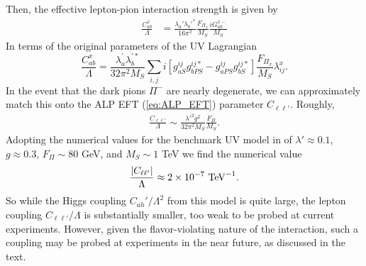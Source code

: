 Then, the effective lepton-pion interaction strength is given by
\begin{align}
    \frac{C_{ab}^x}{\Lambda} &= \frac{\lambda_a'\lambda_b'^*}{16\pi^2}\frac{F_{\Pi_x}}{M_S}\frac{iG_{ab}^{x-}}{M_S}
\end{align}
In terms of the original parameters of the UV Lagrangian
\begin{equation}
\frac{C_{ab}^x}{\Lambda} = \frac{\lambda_a^\prime\lambda_b^{\prime*}}{32\pi^2M_S}\sum_{i,j}i\left[g_{aS}^{ij}g_{bPS}^{ij*} - g_{aPS}^{ij}g_{bS}^{ij*}\right]\frac{F_{\Pi_x}}{M_S}\lambda_{ij}^x.
\end{equation}
In the event that the dark pions $\Pi^-$ are nearly degenerate, we can approximately match this onto the ALP EFT (\ref{eq:ALP_EFT}) parameter $C_{\ell\ell'}$. Roughly,
\begin{align}
    \frac{C_{\ell\ell'}}{\Lambda} \sim \frac{\lambda'^2 g^2}{32\pi^2 M_S}\frac{F_\Pi}{M_S}.
\end{align}
Adopting the numerical values for the benchmark UV model in \cite{Davoudiasl:2017zws} of $\lambda' \approx 0.1$,  $g \approx 0.3$, $F_\Pi \sim 80$ GeV, and $M_S \sim 1$ TeV we find the numerical value
%
\begin{equation}
\frac{|C_{\ell \ell'}|}{\Lambda} \approx 2 \times 10^{-7}\ {\rm TeV}^{-1}.
\end{equation}
So while the Higgs coupling $C_{ah}'/\Lambda^2$ from this model is quite large, the lepton coupling $C_{\ell\ell'}/\Lambda$ is substantially smaller, too weak to be probed at current experiments. However, given the flavor-violating nature of the interaction, such a coupling may be probed at experiments in the near future, as discussed in the text.